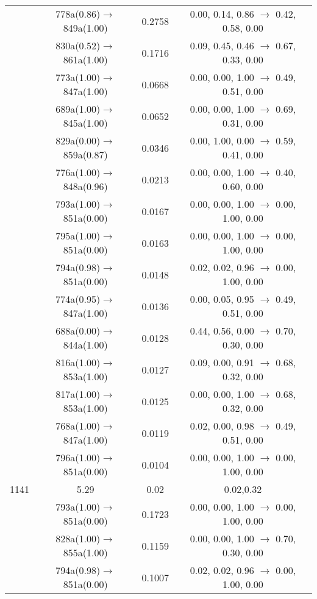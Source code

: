 \documentclass[10pt,a4paper]{article}
\begin{document}
\begin{longtable}{c|c|c|c}
  	& 778a(0.86)$\rightarrow$849a(1.00) &	 0.2758 &	 0.00, 0.14, 0.86 $\rightarrow$ 0.42, 0.58, 0.00 \\ 
 	& 830a(0.52)$\rightarrow$861a(1.00) &	 0.1716 &	 0.09, 0.45, 0.46 $\rightarrow$ 0.67, 0.33, 0.00 \\ 
 	& 773a(1.00)$\rightarrow$847a(1.00) &	 0.0668 &	 0.00, 0.00, 1.00 $\rightarrow$ 0.49, 0.51, 0.00 \\ 
 	& 689a(1.00)$\rightarrow$845a(1.00) &	 0.0652 &	 0.00, 0.00, 1.00 $\rightarrow$ 0.69, 0.31, 0.00 \\ 
 	& 829a(0.00)$\rightarrow$859a(0.87) &	 0.0346 &	 0.00, 1.00, 0.00 $\rightarrow$ 0.59, 0.41, 0.00 \\ 
 	& 776a(1.00)$\rightarrow$848a(0.96) &	 0.0213 &	 0.00, 0.00, 1.00 $\rightarrow$ 0.40, 0.60, 0.00 \\ 
 	& 793a(1.00)$\rightarrow$851a(0.00) &	 0.0167 &	 0.00, 0.00, 1.00 $\rightarrow$ 0.00, 1.00, 0.00 \\ 
 	& 795a(1.00)$\rightarrow$851a(0.00) &	 0.0163 &	 0.00, 0.00, 1.00 $\rightarrow$ 0.00, 1.00, 0.00 \\ 
 	& 794a(0.98)$\rightarrow$851a(0.00) &	 0.0148 &	 0.02, 0.02, 0.96 $\rightarrow$ 0.00, 1.00, 0.00 \\ 
 	& 774a(0.95)$\rightarrow$847a(1.00) &	 0.0136 &	 0.00, 0.05, 0.95 $\rightarrow$ 0.49, 0.51, 0.00 \\ 
 	& 688a(0.00)$\rightarrow$844a(1.00) &	 0.0128 &	 0.44, 0.56, 0.00 $\rightarrow$ 0.70, 0.30, 0.00 \\ 
 	& 816a(1.00)$\rightarrow$853a(1.00) &	 0.0127 &	 0.09, 0.00, 0.91 $\rightarrow$ 0.68, 0.32, 0.00 \\ 
 	& 817a(1.00)$\rightarrow$853a(1.00) &	 0.0125 &	 0.00, 0.00, 1.00 $\rightarrow$ 0.68, 0.32, 0.00 \\ 
 	& 768a(1.00)$\rightarrow$847a(1.00) &	 0.0119 &	 0.02, 0.00, 0.98 $\rightarrow$ 0.49, 0.51, 0.00 \\ 
 	& 796a(1.00)$\rightarrow$851a(0.00) &	 0.0104 &	 0.00, 0.00, 1.00 $\rightarrow$ 0.00, 1.00, 0.00 \\ 
 \hline1141 &	 5.29 &	 0.02 &	 0.02,0.32 \\ 
  	& 793a(1.00)$\rightarrow$851a(0.00) &	 0.1723 &	 0.00, 0.00, 1.00 $\rightarrow$ 0.00, 1.00, 0.00 \\ 
 	& 828a(1.00)$\rightarrow$855a(1.00) &	 0.1159 &	 0.00, 0.00, 1.00 $\rightarrow$ 0.70, 0.30, 0.00 \\ 
 	& 794a(0.98)$\rightarrow$851a(0.00) &	 0.1007 &	 0.02, 0.02, 0.96 $\rightarrow$ 0.00, 1.00, 0.00 \\ 

\end{longtable}
\end{document}
